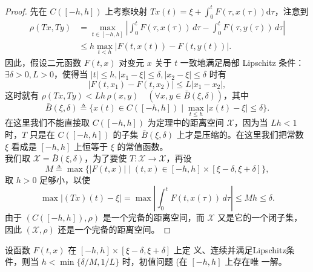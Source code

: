 \documentclass[lang=cn,newtx,10pt,scheme=chinese,thmcnt=chapter]{elegantbook}
\newcommand{\dif}{\mathrm{d}}
\begin{document}
\begin{proof}
先在 $C([-h, h])$ 上考察映射 $Tx(t)=\xi+\int_0^t F(\tau, x(\tau)) \dif \tau$，注意到
\begin{equation*}
\begin{aligned}
\rho(T x, T y) &= \max_{t \in [-h, h]} \left| \int_0^t F(\tau, x(\tau)) \, d\tau - \int_0^t F(\tau, y(\tau)) \, d\tau \right| \\
& \leqslant h \max_{t < h} |F(t, x(t)) - F(t, y(t))| .
\end{aligned}
\end{equation*}
因此，假设二元函数 $F(t, x)$ 对变元 $x$ 关于 $t$ 一致地满足局部 Lipschitz 条件：$\exists \delta > 0, L > 0$，使得当 $|t| \leqslant h, |x_1 - \xi| \leqslant \delta, |x_2 - \xi| \leqslant \delta$ 时有
\begin{equation*}
|F(t, x_1) - F(t, x_2)| \leqslant L |x_1 - x_2| ,
\end{equation*}
这时就有 $\rho(T x, T y) < L h \, \rho(x, y) \quad (\forall x, y \in \bar{B}(\xi, \delta))$，其中
\[
\bar{B}(\xi, \delta) \triangleq \{ x(t) \in C([-h, h]) \mid \max_{t \leqslant h} | x(t) - \xi | \leqslant \delta \} .
\]
在这里我们不能直接取 $C([-h, h])$ 为定理中的距离空间 $\mathscr{X}$，因为当 $L h < 1$ 时，$T$ 只是在 $C([-h, h])$ 的子集 $\bar{B}(\xi, \delta)$ 上才是压缩的。在这里我们把常数 $\xi$ 看成是 $[-h, h]$ 上恒等于 $\xi$ 的常值函数。\\
我们取 $\mathscr{X} = \bar{B}(\xi, \delta)$，为了要使 $T: \mathscr{X} \rightarrow \mathscr{X}$，再设
\begin{equation*}
M \triangleq \max \{ |F(t, x)| \mid (t, x) \in [-h, h] \times [\xi - \delta, \xi + \delta] \} ,
\end{equation*}
取 $h > 0$ 足够小，以使
\begin{equation*}
\max |(T x)(t) - \xi| = \max \left| \int_0^t F(t, x(\tau)) \, d\tau \right| \leqslant M h \leqslant \delta .
\end{equation*}
由于 $(C([-h, h]), \rho)$ 是一个完备的距离空间，而 $\mathscr{X}$ 又是它的一个闭子集，因此 $(\mathscr{X}, \rho)$ 还是一个完备的距离空间。
\end{proof}
\begin{theorem}
设函数 $F(t, x)$ 在 $[-h, h] \times[\xi-\delta, \xi+\delta]$ 上定 义、连续并满足Lipschitz条件，则当 $h<\min \{\delta / M, 1 / L\}$ 时，初值问题 (在 $[-h, h]$ 上存在唯 一解。
\end{theorem}
\end{document}
